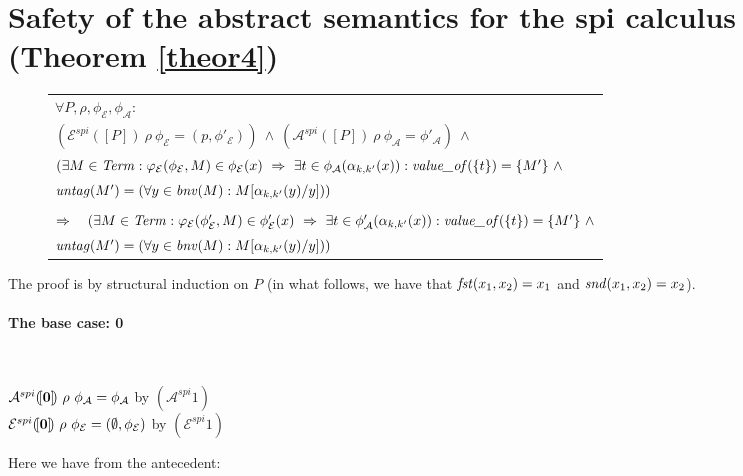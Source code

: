 \documentclass[10pt,a4paper,final,oneside,fleqn]{book}
\begin{document}
\section{Safety of the abstract semantics for the spi calculus (Theorem \ref{theor4})\label{apptheor4}}
\begin{figure}[bht]
\begin{center}
\begin{tabular}{|l|}\hline
$\forall P,\rho,\phi_\mathcal{E},\phi_\mathcal{A}:$\\
$(\mathcal{E}^{spi}(\![P]\!)~\rho~\phi_\mathcal{E}=(p,\phi'_\mathcal{E}))~\wedge~(\mathcal{A}^{spi}(\![P]\!)~\rho~\phi_\mathcal{A}=\phi'_\mathcal{A})~\wedge$\\
$(\exists M\in\mbox{{\itshape Term\/}}:\varphi_\mathcal{E}(\phi_\mathcal{E},M)\in\phi_\mathcal{E}(x)~\Rightarrow~\exists t\in\phi_\mathcal{A}(\alpha_{k,k'}(x)):\mbox{{\itshape value\_of\/}}(\{t\})=\{M'\}~\wedge$\\
$\mbox{{\itshape untag\/}}(M')=(\forall y\in\mbox{{\itshape bnv\/}}(M):M[\alpha_{k,k'}(y)/y]))$\\\\

$\Rightarrow~~~(\exists M\in\mbox{{\itshape Term\/}}:\varphi_\mathcal{E}(\phi'_\mathcal{E},M)\in\phi'_\mathcal{E}(x)~\Rightarrow~\exists t\in\phi'_\mathcal{A}(\alpha_{k,k'}(x)): \mbox{{\itshape value\_of\/}}(\{t\})=\{M'\}~\wedge$\\
$\mbox{{\itshape untag\/}}(M')=(\forall y\in\mbox{{\itshape bnv\/}}(M):M[\alpha_{k,k'}(y)/y]))$\\\hline
\end{tabular} \end{center}
\end{figure}
\noindent
The proof is by structural induction on $P$ (in what follows, we have that $\mbox{{\itshape fst\/}}(x_1,x_2)=x_1$ and $\mbox{{\itshape snd\/}}(x_1,x_2)=x_2$).
\paragraph{The base case: 0}
$ $

\noindent
$\mathcal{A}^{spi}(\![{\bf 0}]\!)~\rho~\phi_\mathcal{A}=\phi_\mathcal{A}\hfill$ by $(\mathcal{A}^{spi} 1)$\\
$\mathcal{E}^{spi}(\![{\bf 0}]\!)~\rho~\phi_\mathcal{E}=(\emptyset,\phi_\mathcal{E})\hfill$ by $(\mathcal{E}^{spi} 1)$\vspace{5mm}

\noindent
Here we have from the antecedent:
\end{document}
